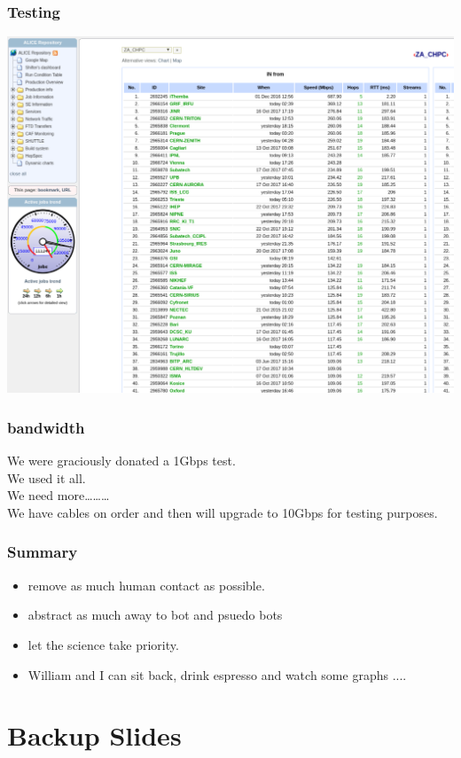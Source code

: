 \documentclass{beamer}
\begin{document}
\begin{frame}
    \frametitle{Testing}
    \includegraphics[scale=0.35]{BandwidthTests.pdf}
\end{frame}

\begin{frame}
  \frametitle{bandwidth}
  We were graciously donated a 1Gbps test.\\
  We used it all.\\
  We need more\ldots\ldots\ldots \\
  We have cables on order and then will upgrade to 10Gbps for testing purposes.
\end{frame}

\begin{frame}
  \frametitle{Summary}
  \begin{itemize}
    \item<1-> remove as much human contact as possible.
    \item<2-> abstract as much away to bot and psuedo bots
    \item<3-> let the science take priority.
    \item<4> William and I can sit back, drink espresso and watch some graphs ....
  \end{itemize}
\end{frame}

\section{Backup Slides}
\end{document}
